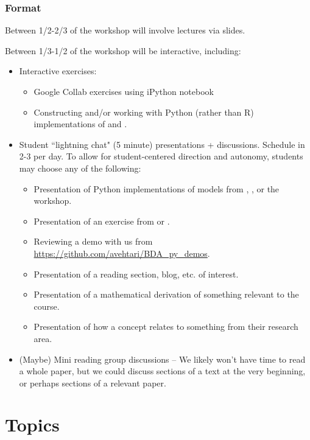 \documentclass{article} %
\begin{document}
\subsubsection{Format}

Between 1/2-2/3 of the workshop will involve lectures via slides.   

Between 1/3-1/2 of the workshop will be interactive,  including:

\begin{itemize}
\item Interactive exercises:
	\begin{itemize}
	\item Google Collab exercises using iPython notebook
	\item Constructing and/or working with Python (rather than R) implementations of \cite{hoff2009first} and \cite{gelman2013bayesian}.
	\end{itemize}
\item Student ``lightning chat" (5 minute) presentations + discussions.    Schedule in 2-3 per day.   To allow for student-centered direction and autonomy,  students may choose any of the following:
	\begin{itemize}
	\item Presentation of Python implementations of models from \cite{hoff2009first} ,  \cite{ gelman2013bayesian},  or the workshop.
	\item Presentation of an exercise from \cite{gelman2013bayesian} or \cite{hoff2009first}.
	\item Reviewing a demo with us from \url{https://github.com/avehtari/BDA_py_demos}.
	\item Presentation of a reading section,  blog,  etc.  of interest.
	\item Presentation of a mathematical derivation of something relevant to the course.
	\item Presentation of how a concept relates to something from their research area.
	\end{itemize}
\item (Maybe) Mini reading group discussions  -- We likely won't have time to read a whole paper,  but we could discuss sections of a text at the very beginning, or perhaps sections of a relevant paper.
\end{itemize}


\section{Topics}
\end{document}
